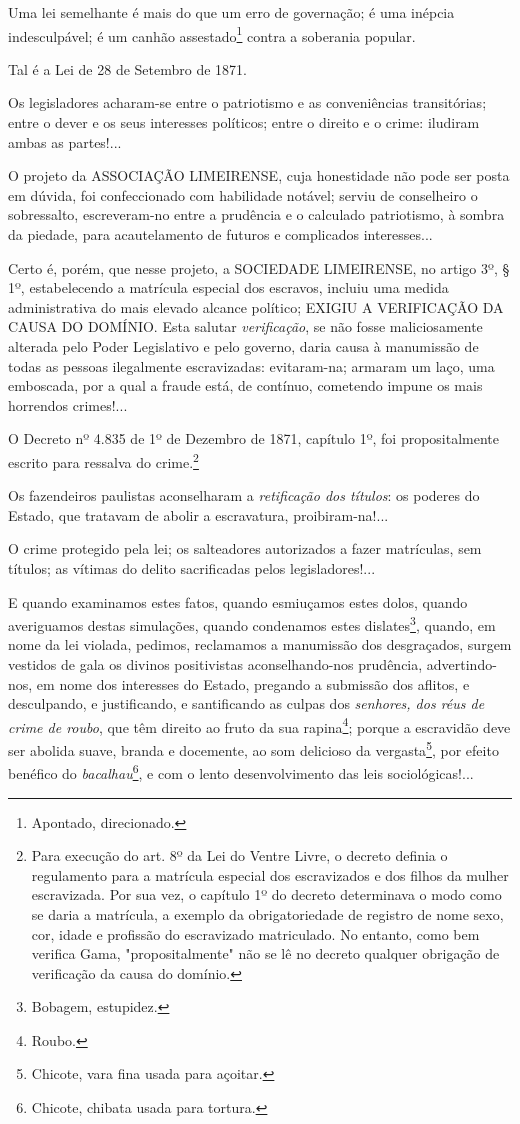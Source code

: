 Uma lei semelhante é mais do que um erro de governação; é uma inépcia
indesculpável; é um canhão assestado\footnote{Apontado, direcionado.}
contra a soberania popular.

Tal é a Lei de 28 de Setembro de 1871.

Os legisladores acharam-se entre o patriotismo e as conveniências
transitórias; entre o dever e os seus interesses políticos; entre o
direito e o crime: iludiram ambas as partes!...

O projeto da ASSOCIAÇÃO LIMEIRENSE, cuja honestidade não pode ser posta
em dúvida, foi confeccionado com habilidade notável; serviu de
conselheiro o sobressalto, escreveram-no entre a prudência e o calculado
patriotismo, à sombra da piedade, para acautelamento de futuros e
complicados interesses...

Certo é, porém, que nesse projeto, a SOCIEDADE LIMEIRENSE, no artigo 3º,
§ 1º, estabelecendo a matrícula especial dos escravos, incluiu uma
medida administrativa do mais elevado alcance político; EXIGIU A
VERIFICAÇÃO DA CAUSA DO DOMÍNIO. Esta salutar \emph{verificação}, se não
fosse maliciosamente alterada pelo Poder Legislativo e pelo governo,
daria causa à manumissão de todas as pessoas ilegalmente escravizadas:
evitaram-na; armaram um laço, uma emboscada, por a qual a fraude está,
de contínuo, cometendo impune os mais horrendos crimes!...

O Decreto nº 4.835 de 1º de Dezembro de 1871, capítulo 1º, foi
propositalmente escrito para ressalva do crime.\footnote{Para execução
  do art. 8º da Lei do Ventre Livre, o decreto definia o regulamento
  para a matrícula especial dos escravizados e dos filhos da mulher
  escravizada. Por sua vez, o capítulo 1º do decreto determinava o modo
  como se daria a matrícula, a exemplo da obrigatoriedade de registro de
  nome sexo, cor, idade e profissão do escravizado matriculado. No
  entanto, como bem verifica Gama, "propositalmente" não se lê no
  decreto qualquer obrigação de verificação da causa do domínio.}

Os fazendeiros paulistas aconselharam a \emph{retificação dos títulos}:
os poderes do Estado, que tratavam de abolir a escravatura,
proibiram-na!...

O crime protegido pela lei; os salteadores autorizados a fazer
matrículas, sem títulos; as vítimas do delito sacrificadas pelos
legisladores!...

E quando examinamos estes fatos, quando esmiuçamos estes dolos, quando
averiguamos destas simulações, quando condenamos estes
dislates\footnote{Bobagem, estupidez.}, quando, em nome da lei
violada, pedimos, reclamamos a manumissão dos desgraçados, surgem
vestidos de gala os divinos positivistas aconselhando-nos prudência,
advertindo-nos, em nome dos interesses do Estado, pregando a submissão
dos aflitos, e desculpando, e justificando, e santificando as culpas dos
\emph{senhores, dos réus de crime de roubo}, que têm direito ao fruto da
sua rapina\footnote{Roubo.}; porque a escravidão deve ser abolida
suave, branda e docemente, ao som delicioso da vergasta\footnote{
  Chicote, vara fina usada para açoitar.}, por efeito benéfico do
\emph{bacalhau}\footnote{Chicote, chibata usada para tortura.},
e com o lento
desenvolvimento das leis sociológicas!...

